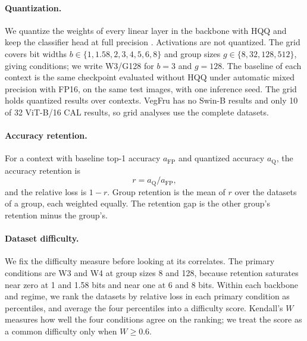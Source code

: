 \paragraph{Quantization.}
We quantize the weights of every linear layer in the backbone with HQQ and keep the classifier head at full precision .
Activations are not quantized.
The grid covers bit widths $b \in \{1, 1.58, 2, 3, 4, 5, 6, 8\}$ and group sizes $g \in \{8, 32, 128, 512\}$, giving  conditions; we write W3/G128 for $b=3$ and $g=128$.
The baseline of each context is the same checkpoint evaluated without HQQ under automatic mixed precision with FP16, on the same test images, with one inference seed.
The grid holds  quantized results over  contexts.
VegFru has no Swin-B results and only 10 of 32 ViT-B/16 CAL results, so grid analyses use the  complete datasets.

\paragraph{Accuracy retention.}
For a context with baseline top-1 accuracy $a_{\mathrm{FP}}$ and quantized accuracy $a_{\mathrm{Q}}$, the accuracy retention is
\begin{equation}
  r = a_{\mathrm{Q}} / a_{\mathrm{FP}},
  \label{eq:retention}
\end{equation}
and the relative loss is $1-r$.
Group retention is the mean of $r$ over the datasets of a group, each weighted equally.
The retention gap is the other group's retention minus the \SC{} group's.

\paragraph{Dataset difficulty.}
We fix the difficulty measure before looking at its correlates.
The primary conditions are W3 and W4 at group sizes 8 and 128, because retention saturates near zero at 1 and 1.58 bits and near one at 6 and 8 bits.
Within each backbone and regime, we rank the datasets by relative loss in each primary condition as percentiles, and average the four percentiles into a difficulty score.
Kendall's $W$ measures how well the four conditions agree on the ranking; we treat the score as a common difficulty only when $W \ge 0.6$.


